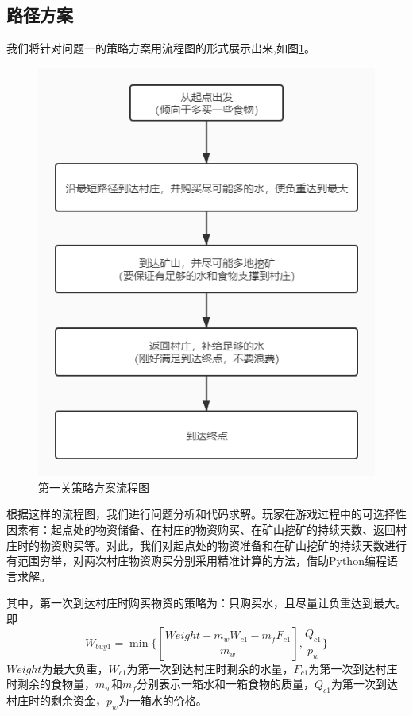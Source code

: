 \documentclass[withoutpre]{cumcmthesis} %
\begin{document}
\subsection{路径方案}
我们将针对问题一的策略方案用流程图的形式展示出来,如图\ref{fig:map1lc}。
\begin{figure}[h]
	\centering
	\includegraphics[scale=0.4]{figures/map1liuchengtu}
	\caption{第一关策略方案流程图}
	\label{fig:map1lc}
\end{figure}
根据这样的流程图，我们进行问题分析和代码求解。玩家在游戏过程中的可选择性因素有：起点处的物资储备、在村庄的物资购买、在矿山挖矿的持续天数、返回村庄时的物资购买等。对此，我们对起点处的物资准备和在矿山挖矿的持续天数进行有范围穷举，对两次村庄物资购买分别采用精准计算的方法，借助Python编程语言求解。

其中，第一次到达村庄时购买物资的策略为：只购买水，且尽量让负重达到最大。即
\begin{equation}
	W_{buy1}=\min\{[\displaystyle \frac{Weight-m_wW_{c1}-m_fF_{c1}}{m_w}],\frac{Q_{c1}}{p_w}\}
\end{equation}
$Weight$为最大负重，$W_{c1}$为第一次到达村庄时剩余的水量，$F_{c1}$为第一次到达村庄时剩余的食物量，$m_w$和$m_f$分别表示一箱水和一箱食物的质量，$Q_{c1}$为第一次到达村庄时的剩余资金，$p_w$为一箱水的价格。\\
\end{document}
